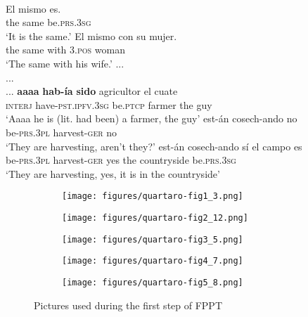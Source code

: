 \documentclass[output=paper]{langsci/langscibook}
\begin{document}
\ea \label{ex:gq12}
\\
	\ea \label{ex:gq12a}
	\gll El mismo es.\\
	the same be.\textsc{prs.3sg}\\
	\glt ‘It is the same.’
	\ex \label{ex:gq12b}
	\gll  El mismo con su mujer.\\
	the same with \textsc{3.pos} woman\\
	\glt ‘The same with his wife.’
	\ex  \label{ex:gq12c}
	\gll ...\\
	{...}\\
	\glt ...
	\ex \label{ex:gq12d}
	\gll \textbf{aaaa} \textbf{hab-ía} \textbf{sido} agricultor el cuate\\
	\textsc{interj} have-\textsc{pst.ipfv.3sg} be.\textsc{ptcp} farmer the guy\\
	\glt ‘Aaaa he is (lit. had been) a farmer, the guy’
	\ex \label{ex:gq12e}
	\gll est-án cosech-ando no\\
	be-\textsc{prs.3pl} harvest-\textsc{ger} no\\
	\glt ‘They are harvesting, aren’t they?’
	\ex \label{ex:gq12f}
	\gll est-án cosech-ando sí el  campo es\\
	be-\textsc{prs.3pl} harvest-\textsc{ger} yes the countryside be.\textsc{prs.3sg}\\
	\glt ‘They are harvesting, yes, it is in the countryside’
	\z
\z

\begin{figure}[ht]
\centering
\begin{subfigure}{0.4\textwidth}
\centering
\texttt{[image: figures/quartaro-fig1\_3.png]}  
\caption{ } %
\end{subfigure}
\begin{subfigure}{0.4\textwidth}
\centering
\texttt{[image: figures/quartaro-fig2\_12.png]}
\caption{ } %
\end{subfigure}
\bigskip 
\begin{subfigure}{0.4\textwidth}
\centering
\texttt{[image: figures/quartaro-fig3\_5.png]}
\caption{ } %
\end{subfigure}
\begin{subfigure}{0.4\textwidth}
\centering
\texttt{[image: figures/quartaro-fig4\_7.png]}
\caption{ } %
\end{subfigure}
\begin{subfigure}{0.4\textwidth}
\centering
\texttt{[image: figures/quartaro-fig5\_8.png]}
\caption{ } %
\end{subfigure}
\caption{Pictures used during the first step of FPPT}
\label{fig:gq2}
\end{figure}
\end{document}

